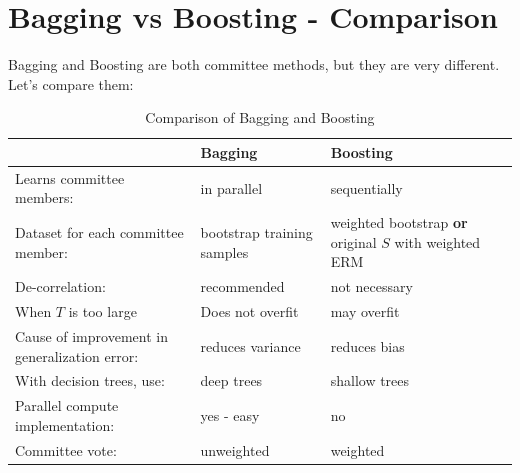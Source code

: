 \documentclass[11pt]{article}
\begin{document}
\section{Bagging vs Boosting - Comparison}

Bagging and Boosting are both committee methods, but they are very different.
Let's compare them:

\begin{table}[H]
  \centering
  \begin{tabular}{|p{4.5cm}|p{5cm}|p{6.5cm}|}
    \hline
    & {\bf Bagging} & {\bf Boosting} \\
     \hline
      Learns committee members: & in parallel & sequentially \\
      \hline
      Dataset for each committee member: & bootstrap training samples
      & weighted bootstrap  {\bf or} original $S$ with weighted ERM\\
      \hline
      De-correlation: & recommended & not necessary \\
      \hline
      When $T$ is too large & Does not overfit & may overfit \\
      \hline
      Cause of improvement in generalization error: &
      reduces variance & reduces bias\\
      \hline
      With decision trees, use: & deep trees & shallow trees \\
      \hline
      Parallel compute implementation: & yes - easy & no \\
       \hline
      Committee vote: & unweighted & weighted \\
    \hline
  \end{tabular}
  \caption{Comparison of Bagging and Boosting}
\end{table}
\end{document}
